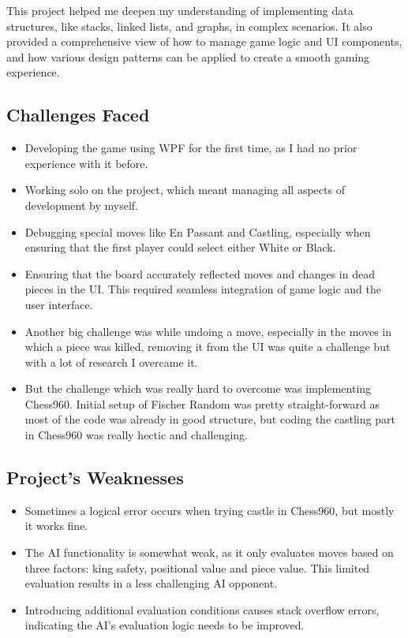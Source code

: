 \documentclass[a4paper,12pt]{article}
\begin{document}
This project helped me deepen my understanding of implementing data structures, like stacks, linked lists, and graphs, in complex scenarios. It also provided a comprehensive view of how to manage game logic and UI components, and how various design patterns can be applied to create a smooth gaming experience.

\subsection{Challenges Faced}
\begin{itemize}
    \item Developing the game using WPF for the first time, as I had no prior experience with it before.
    \item Working solo on the project, which meant managing all aspects of development by myself.
    \item Debugging special moves like En Passant and Castling, especially when ensuring that the first player could select either White or Black.
    \item Ensuring that the board accurately reflected moves and changes in dead pieces in the UI. This required seamless integration of game logic and the user interface.
    \item Another big challenge was while undoing a move, especially in the moves in which a piece was killed, removing it from the UI was quite a challenge but with a lot of research I overcame it. 
    \item But the challenge which was really hard to overcome was implementing Chess960. Initial setup of Fischer Random was pretty straight-forward as most of the code was already in good structure, but coding the castling part in Chess960 was really hectic and challenging.
\end{itemize}

\subsection{Project's Weaknesses}
\begin{itemize}
    \item Sometimes a logical error occurs when trying castle in Chess960, but mostly it works fine.
    \item The AI functionality is somewhat weak, as it only evaluates moves based on three factors: king safety, positional value and piece value. This limited evaluation results in a less challenging AI opponent.
    \item Introducing additional evaluation conditions causes stack overflow errors, indicating the AI’s evaluation logic needs to be improved.
\end{itemize}
\end{document}
